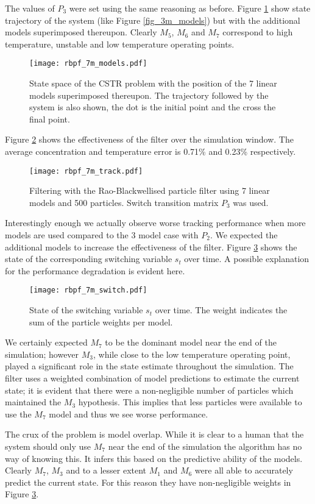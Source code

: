 The values of $P_3$ were set using the same reasoning as before. Figure \ref{fig_7m_models} show state trajectory of the system (like Figure \ref{fig_3m_models}) but with the additional models superimposed thereupon. Clearly $M_5$, $M_6$ and $M_7$ correspond to high temperature, unstable and low temperature operating points. 
\begin{figure}[H] 
\centering
\texttt{[image: rbpf\_7m\_models.pdf]}
\caption{State space of the CSTR problem with the position of the 7 linear models superimposed thereupon. The trajectory followed by the system is also shown, the dot is the initial point and the cross the final point.}
\label{fig_7m_models}
\end{figure}
Figure \ref{fig_7m_track} shows the effectiveness of the filter over the simulation window. The average concentration and temperature error is 0.71\% and 0.23\% respectively. 
\begin{figure}[H] 
\centering
\texttt{[image: rbpf\_7m\_track.pdf]}
\caption{Filtering with the Rao-Blackwellised particle filter using 7 linear models and 500 particles. Switch transition matrix $P_3$ was used.}
\label{fig_7m_track}
\end{figure}
Interestingly enough we actually observe worse tracking performance when more models are used compared to the 3 model case with $P_2$. We expected the additional models to increase the effectiveness of the filter. Figure \ref{fig_7m_switch} shows the state of the corresponding switching variable $s_t$ over time. A possible explanation for the performance degradation is evident here.
\begin{figure}[H] 
\centering
\texttt{[image: rbpf\_7m\_switch.pdf]}
\caption{State of the switching variable $s_t$ over time. The weight indicates the sum of the particle weights per model.}
\label{fig_7m_switch}
\end{figure}
We certainly expected $M_7$ to be the dominant model near the end of the simulation; however $M_3$, while close to the low temperature operating point, played a significant role in the state estimate throughout the simulation. The filter uses a weighted combination of model predictions to estimate the current state; it is evident that there were a non-negligible number of particles which maintained the $M_3$ hypothesis. This implies that less particles were available to use the $M_7$ model and thus we see worse performance.

The crux of the problem is model overlap. While it is clear to a human that the system should only use $M_7$ near the end of the simulation the algorithm has no way of knowing this. It infers this based on the predictive ability of the models. Clearly $M_7$, $M_3$ and to a lesser extent $M_1$ and $M_6$ were all able to accurately predict the current state. For this reason they have non-negligible weights in Figure \ref{fig_7m_switch}.  

